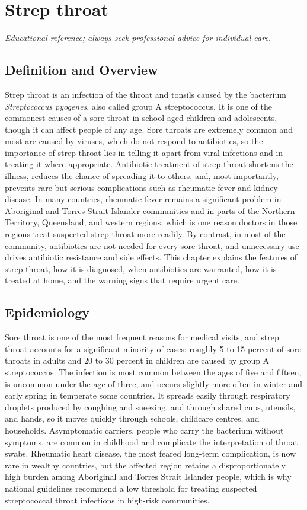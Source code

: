 \chapter{Strep throat}

\medskip
\noindent\textit{Educational reference; always seek professional advice for individual care.}

\section*{Definition and Overview}
Strep throat is an infection of the throat and tonsils caused by the bacterium \textit{Streptococcus pyogenes}, also called group A streptococcus. It is one of the commonest causes of a sore throat in school-aged children and adolescents, though it can affect people of any age. Sore throats are extremely common and most are caused by viruses, which do not respond to antibiotics, so the importance of strep throat lies in telling it apart from viral infections and in treating it where appropriate. Antibiotic treatment of strep throat shortens the illness, reduces the chance of spreading it to others, and, most importantly, prevents rare but serious complications such as rheumatic fever and kidney disease. In many countries, rheumatic fever remains a significant problem in Aboriginal and Torres Strait Islander communities and in parts of the Northern Territory, Queensland, and western regions, which is one reason doctors in those regions treat suspected strep throat more readily. By contrast, in most of the community, antibiotics are not needed for every sore throat, and unnecessary use drives antibiotic resistance and side effects. This chapter explains the features of strep throat, how it is diagnosed, when antibiotics are warranted, how it is treated at home, and the warning signs that require urgent care.

\section*{Epidemiology}
Sore throat is one of the most frequent reasons for medical visits, and strep throat accounts for a significant minority of cases: roughly 5 to 15 percent of sore throats in adults and 20 to 30 percent in children are caused by group A streptococcus. The infection is most common between the ages of five and fifteen, is uncommon under the age of three, and occurs slightly more often in winter and early spring in temperate some countries. It spreads easily through respiratory droplets produced by coughing and sneezing, and through shared cups, utensils, and hands, so it moves quickly through schools, childcare centres, and households. Asymptomatic carriers, people who carry the bacterium without symptoms, are common in childhood and complicate the interpretation of throat swabs. Rheumatic heart disease, the most feared long-term complication, is now rare in wealthy countries, but the affected region retains a disproportionately high burden among Aboriginal and Torres Strait Islander people, which is why national guidelines recommend a low threshold for treating suspected streptococcal throat infections in high-risk communities.

